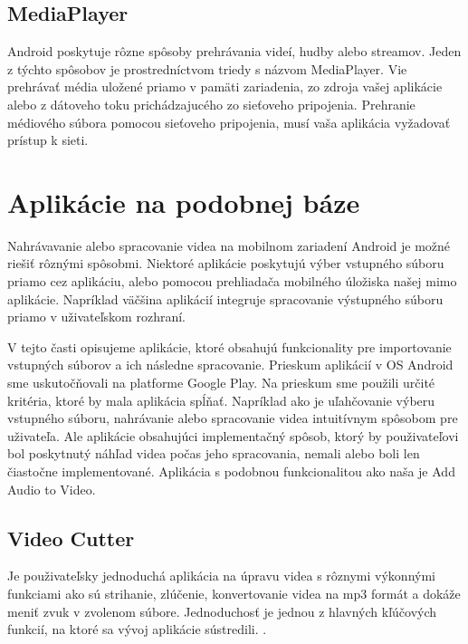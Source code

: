 \documentclass[12pt, oneside]{book}
\begin{document}
\subsection{MediaPlayer}

\hspace{15pt} Android poskytuje rôzne spôsoby prehrávania videí, hudby alebo streamov. Jeden z týchto spôsobov je prostredníctvom triedy s názvom MediaPlayer. Vie prehrávať média uložené priamo v pamäti zariadenia, zo zdroja vašej aplikácie alebo z dátoveho toku prichádzajucého zo sieťoveho pripojenia. Prehranie médiového súbora pomocou sieťoveho pripojenia, musí vaša aplikácia vyžadovať prístup k sieti.

\section{Aplikácie na podobnej báze}

\hspace{15pt} 

Nahrávavanie alebo spracovanie videa na mobilnom zariadení Android je možné riešiť rôznými spôsobmi. Niektoré aplikácie poskytujú výber vstupného súboru priamo cez aplikáciu, alebo pomocou prehliadača mobilného úložiska našej mimo aplikácie. Napríklad väčšina aplikácií integruje spracovanie výstupného súboru priamo v uživateľskom rozhraní.

V tejto časti opisujeme aplikácie, ktoré obsahujú funkcionality pre importovanie vstupných súborov a ich následne spracovanie. Prieskum aplikácií v OS Android sme uskutočňovali na platforme Google Play. Na prieskum sme použili určité kritéria, ktoré by mala aplikácia spĺňať. Napríklad ako je uľahčovanie výberu vstupného súboru, nahrávanie alebo spracovanie videa intuitívnym spôsobom pre uživateľa. Ale aplikácie obsahujúci implementačný spôsob, ktorý by použivateľovi bol poskytnutý náhľad videa počas jeho spracovania, nemali alebo boli len čiastočne implementované. Aplikácia s podobnou funkcionalitou ako naša je Add Audio to Video.


\subsection{Video Cutter}

\hspace{15pt} Je použivateľsky jednoduchá aplikácia na úpravu videa s rôznymi výkonnými funkciami ako sú strihanie, zlúčenie, konvertovanie videa na mp3 formát a dokáže meniť zvuk v zvolenom súbore. 
Jednoduchosť je jednou z hlavných kľúčových funkcií, na ktoré sa vývoj aplikácie sústredili. \citep{aplikacia2}.
\end{document}
